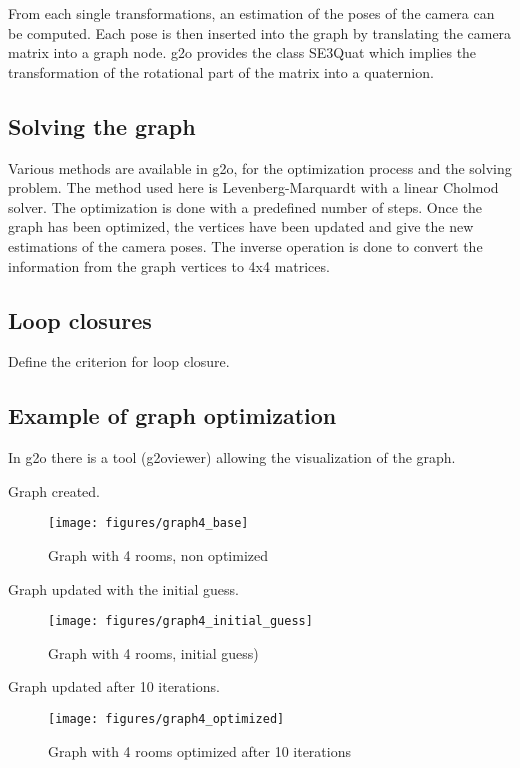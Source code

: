 \documentclass[a4paper,11pt]{kth-mag}
\begin{document}
From each single transformations, an estimation of the poses of the camera can be computed. Each pose is then inserted into the graph by translating the camera matrix into a graph node. g2o provides the class SE3Quat which implies the transformation of the rotational part of the matrix into a quaternion.

\subsection{Solving the graph}

Various methods are available in g2o, for the optimization process and the solving problem. The method used here is Levenberg-Marquardt with a linear Cholmod solver. The optimization is done with a predefined number of steps. Once the graph has been optimized, the vertices have been updated and give the new estimations of the camera poses. The inverse operation is done to convert the information from the graph vertices to 4x4 matrices.

\subsection{Loop closures}

Define the criterion for loop closure.

\subsection{Example of graph optimization}
In g2o there is a tool (g2oviewer) allowing the visualization of the graph.

Graph created.
\begin{figure}[h]
\centering
\texttt{[image: figures/graph4\_base]}
\caption{Graph with 4 rooms, non optimized}
\end{figure}

Graph updated with the initial guess.
\begin{figure}[h]
\centering
\texttt{[image: figures/graph4\_initial\_guess]}
\caption{Graph with 4 rooms, initial guess)}
\end{figure}

Graph updated after 10 iterations.
\begin{figure}[h]
\centering
\texttt{[image: figures/graph4\_optimized]}
\caption{Graph with 4 rooms optimized after 10 iterations}
\end{figure}
\end{document}
